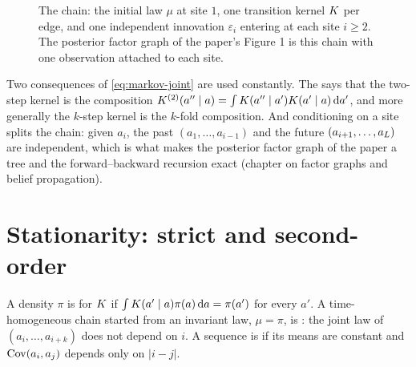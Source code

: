 \begin{figure}[t]
\centering
{}
\caption{The chain: the initial law $\mu$ at site $1$, one transition kernel $K$
per edge, and one independent innovation $\varepsilon_i$ entering at each site $i\ge2$.
The posterior factor graph of the paper's Figure 1 is this chain with one observation
attached to each site.}
\label{fig:chain}
\end{figure}

Two consequences of \cref{eq:markov-joint} are used constantly. The
 says that the two-step kernel is the composition
$K^{(2)}(a''\mid a)=\int K(a''\mid a')K(a'\mid a)\,\mathrm{d} a'$, and more
generally the $k$-step kernel is the $k$-fold composition. And conditioning on a site
splits the chain: given $a_i$, the past $(a_1,\dots,a_{i-1})$ and the future
$(a_{i+1},\dots,a_{L})$ are independent, which is what makes the posterior factor
graph of the paper a tree and the forward--backward recursion exact (chapter on
factor graphs and belief propagation).

\section{Stationarity: strict and second-order}

\begin{definition}
A density $\pi$ is  for $K$ if $\int K(a'\mid a)\pi(a)\,\mathrm{d} a=\pi(a')$
for every $a'$. A time-homogeneous chain started from an invariant law,
$\mu=\pi$, is : the joint law of $(a_i,\dots,a_{i+k})$ does
not depend on $i$. A sequence is  if its means are
constant and $\operatorname{Cov}(a_i,a_j)$ depends only on $|i-j|$.
\end{definition}

